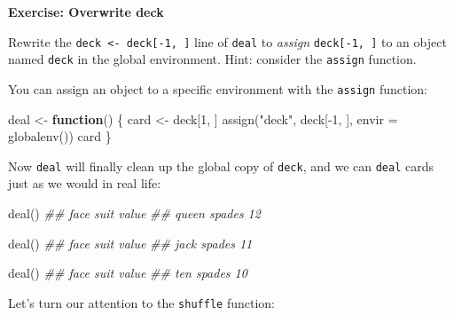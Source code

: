 \documentclass[
  letterpaper,
  DIV=11,
  numbers=noendperiod]{scrbook}
\newenvironment{Shaded}{\begin{snugshade}}{\end{snugshade}}
\newcommand{\AttributeTok}[1]{\textcolor[rgb]{0.40,0.45,0.13}{#1}}
\newcommand{\ControlFlowTok}[1]{\textcolor[rgb]{0.00,0.23,0.31}{\textbf{#1}}}
\newcommand{\DecValTok}[1]{\textcolor[rgb]{0.68,0.00,0.00}{#1}}
\newcommand{\DocumentationTok}[1]{\textcolor[rgb]{0.37,0.37,0.37}{\textit{#1}}}
\newcommand{\FunctionTok}[1]{\textcolor[rgb]{0.28,0.35,0.67}{#1}}
\newcommand{\NormalTok}[1]{\textcolor[rgb]{0.00,0.23,0.31}{#1}}
\newcommand{\OtherTok}[1]{\textcolor[rgb]{0.00,0.23,0.31}{#1}}
\newcommand{\SpecialCharTok}[1]{\textcolor[rgb]{0.37,0.37,0.37}{#1}}
\newcommand{\StringTok}[1]{\textcolor[rgb]{0.13,0.47,0.30}{#1}}
\begin{document}
\begin{tcolorbox}[enhanced jigsaw, left=2mm, breakable, colback=white, colframe=quarto-callout-color-frame, leftrule=.75mm, bottomrule=.15mm, arc=.35mm, opacityback=0, rightrule=.15mm, toprule=.15mm]

\vspace{-3mm}\textbf{Exercise: Overwrite deck}\vspace{3mm}

Rewrite the \texttt{deck\ \textless{}-\ deck{[}-1,\ {]}} line of
\texttt{deal} to \emph{assign} \texttt{deck{[}-1,\ {]}} to an object
named \texttt{deck} in the global environment. Hint: consider the
\texttt{assign} function.

\end{tcolorbox}

You can assign an object to a specific environment with the
\texttt{assign} function:

\begin{Shaded}
\begin{Highlighting}[]
\NormalTok{deal }\OtherTok{\textless{}{-}} \ControlFlowTok{function}\NormalTok{() \{}
\NormalTok{  card }\OtherTok{\textless{}{-}}\NormalTok{ deck[}\DecValTok{1}\NormalTok{, ]}
  \FunctionTok{assign}\NormalTok{(}\StringTok{"deck"}\NormalTok{, deck[}\SpecialCharTok{{-}}\DecValTok{1}\NormalTok{, ], }\AttributeTok{envir =} \FunctionTok{globalenv}\NormalTok{())}
\NormalTok{  card}
\NormalTok{\}}
\end{Highlighting}
\end{Shaded}

Now \texttt{deal} will finally clean up the global copy of
\texttt{deck}, and we can \texttt{deal} cards just as we would in real
life:

\begin{Shaded}
\begin{Highlighting}[]
\FunctionTok{deal}\NormalTok{()}
\DocumentationTok{\#\#  face   suit value}
\DocumentationTok{\#\# queen spades    12}

\FunctionTok{deal}\NormalTok{()}
\DocumentationTok{\#\# face   suit value}
\DocumentationTok{\#\# jack spades    11}

\FunctionTok{deal}\NormalTok{()}
\DocumentationTok{\#\# face   suit value}
\DocumentationTok{\#\#  ten spades    10}
\end{Highlighting}
\end{Shaded}

Let's turn our attention to the \texttt{shuffle} function:
\end{document}
